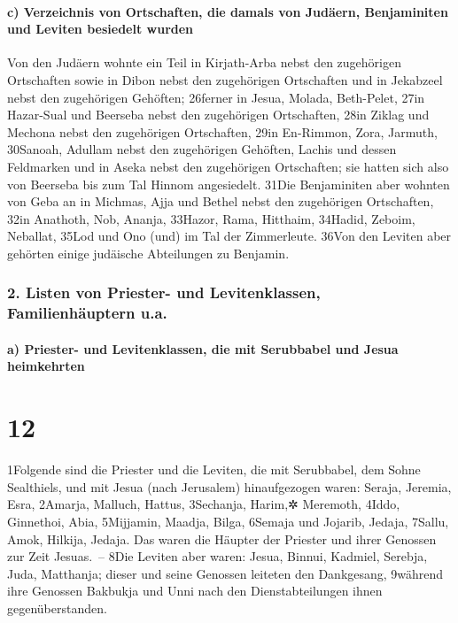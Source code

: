 \hypertarget{c-verzeichnis-von-ortschaften-die-damals-von-juduxe4ern-benjaminiten-und-leviten-besiedelt-wurden}{%
\paragraph{c) Verzeichnis von Ortschaften, die damals von Judäern,
Benjaminiten und Leviten besiedelt
wurden}\label{c-verzeichnis-von-ortschaften-die-damals-von-juduxe4ern-benjaminiten-und-leviten-besiedelt-wurden}}

Von den Judäern wohnte ein Teil in Kirjath-Arba nebst den zugehörigen
Ortschaften sowie in Dibon nebst den zugehörigen Ortschaften und in
Jekabzeel nebst den zugehörigen Gehöften; 26ferner in Jesua, Molada,
Beth-Pelet, 27in Hazar-Sual und Beerseba nebst den zugehörigen
Ortschaften, 28in Ziklag und Mechona nebst den zugehörigen Ortschaften,
29in En-Rimmon, Zora, Jarmuth, 30Sanoah, Adullam nebst den zugehörigen
Gehöften, Lachis und dessen Feldmarken und in Aseka nebst den
zugehörigen Ortschaften; sie hatten sich also von Beerseba bis zum Tal
Hinnom angesiedelt. 31Die Benjaminiten aber wohnten von Geba an in
Michmas, Ajja und Bethel nebst den zugehörigen Ortschaften, 32in
Anathoth, Nob, Ananja, 33Hazor, Rama, Hitthaim, 34Hadid, Zeboim,
Neballat, 35Lod und Ono (und) im Tal der Zimmerleute. 36Von den Leviten
aber gehörten einige judäische Abteilungen zu Benjamin.

\hypertarget{listen-von-priester--und-levitenklassen-familienhuxe4uptern-u.a.}{%
\subsubsection{2. Listen von Priester- und Levitenklassen,
Familienhäuptern
u.a.}\label{listen-von-priester--und-levitenklassen-familienhuxe4uptern-u.a.}}

\hypertarget{a-priester--und-levitenklassen-die-mit-serubbabel-und-jesua-heimkehrten}{%
\paragraph{a) Priester- und Levitenklassen, die mit Serubbabel und Jesua
heimkehrten}\label{a-priester--und-levitenklassen-die-mit-serubbabel-und-jesua-heimkehrten}}

\hypertarget{section-11}{%
\section{12}\label{section-11}}

1Folgende sind die Priester und die Leviten, die mit Serubbabel, dem
Sohne Sealthiels, und mit Jesua (nach Jerusalem) hinaufgezogen waren:
Seraja, Jeremia, Esra, 2Amarja, Malluch, Hattus, 3Sechanja, Harim,✲
Meremoth, 4Iddo, Ginnethoi, Abia, 5Mijjamin, Maadja, Bilga, 6Semaja und
Jojarib, Jedaja, 7Sallu, Amok, Hilkija, Jedaja. Das waren die Häupter
der Priester und ihrer Genossen zur Zeit Jesuas.~-- 8Die Leviten aber
waren: Jesua, Binnui, Kadmiel, Serebja, Juda, Matthanja; dieser und
seine Genossen leiteten den Dankgesang, 9während ihre Genossen Bakbukja
und Unni nach den Dienstabteilungen ihnen gegenüberstanden.

